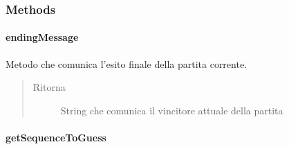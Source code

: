 \documentclass[letterpaper,10pt,italian,openany,oneside]{sphinxmanual}
\begin{document}
\subsubsection{Methods}
\label{\detokenize{test/it/unicam/cs/pa/mastermind/gamecore/SingleMatch:methods}}

\paragraph{endingMessage}
\label{\detokenize{test/it/unicam/cs/pa/mastermind/gamecore/SingleMatch:endingmessage}}

\begin{fulllineitems}
\label{\detokenize{test/it/unicam/cs/pa/mastermind/gamecore/SingleMatch:it.unicam.cs.pa.mastermind.gamecore.SingleMatch.endingMessage()}}
Metodo che comunica l’esito finale della partita corrente.
\begin{quote}\begin{description}
\item[{Ritorna}] \leavevmode
String che comunica il vincitore attuale della partita

\end{description}\end{quote}

\end{fulllineitems}



\paragraph{getSequenceToGuess}
\label{\detokenize{test/it/unicam/cs/pa/mastermind/gamecore/SingleMatch:getsequencetoguess}}

\begin{fulllineitems}
\label{\detokenize{test/it/unicam/cs/pa/mastermind/gamecore/SingleMatch:it.unicam.cs.pa.mastermind.gamecore.SingleMatch.getSequenceToGuess()}}
\end{fulllineitems}
\end{document}
